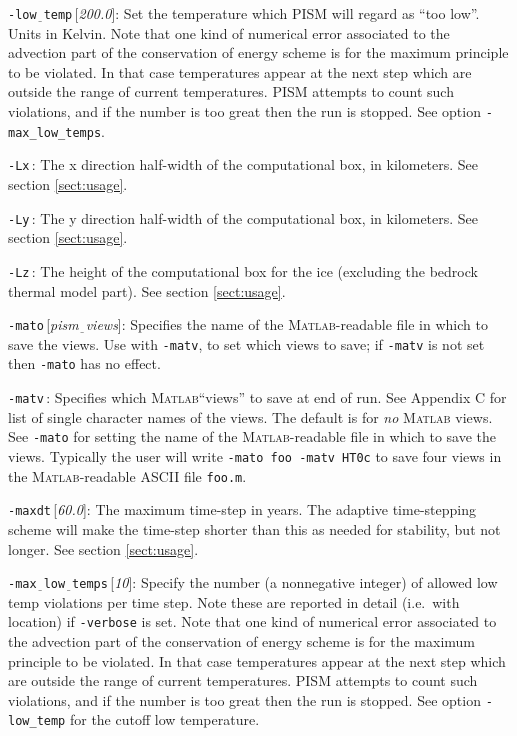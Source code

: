\documentclass[11pt,final]{amsart}
\newcommand{\Matlab}{\textsc{Matlab}\xspace}
\newcommand{\rawopt}[1]{\vspace{1mm}\noindent \large\texttt{-#1}\normalsize}
\newcommand{\opt}[1]{\rawopt{#1}\,:\quad}
\newcommand{\optdef}[2]{\rawopt{#1}\,[\textsl{#2}]:\quad}
\newcommand{\und}{$\underline{\,\,\,}$}
\begin{document}
\optdef{low\und temp}{200.0}  Set the temperature which PISM will regard as ``too low''.  Units in Kelvin.  Note that one kind of numerical error associated to the advection part of the conservation of energy scheme is for the maximum principle to be violated.  In that case temperatures appear at the next step which are outside the range of current temperatures.  PISM attempts to count such violations, and if the number is too great then the run is stopped.  See option \verb|-max_low_temps|.

\opt{Lx}  The x direction half-width of the computational box, in kilometers.  See section \ref{sect:usage}.

\opt{Ly}  The y direction half-width of the computational box, in kilometers.  See section \ref{sect:usage}.

\opt{Lz}  The height of the computational box for the ice (excluding the bedrock thermal model part).  See section \ref{sect:usage}.

\optdef{mato}{pism\und views}  Specifies the name of the \Matlab-readable file in which to save the views.  Use with \verb|-matv|, to set which views to save; if \verb|-matv| is not set then \verb|-mato| has no effect.

\opt{matv}  Specifies which \Matlab ``views'' to save at end of run.  See Appendix C for list of single character names of the views.  The default is for \emph{no} \Matlab views.  See \verb|-mato| for setting the name of the \Matlab-readable file in which to save the views.  Typically the user will write \verb|-mato foo -matv HT0c| to save four views in the \Matlab-readable ASCII file \verb|foo.m|.

\optdef{maxdt}{60.0}  The maximum time-step in years.  The adaptive time-stepping scheme will make the time-step shorter than this as needed for stability, but not longer.  See section \ref{sect:usage}.

\optdef{max\und low\und temps}{10}  Specify the number (a nonnegative integer) of allowed low temp violations per time step.  Note these are reported in detail (i.e.~with location) if \verb|-verbose| is set.  Note that one kind of numerical error associated to the advection part of the conservation of energy scheme is for the maximum principle to be violated.  In that case temperatures appear at the next step which are outside the range of current temperatures.  PISM attempts to count such violations, and if the number is too great then the run is stopped.  See option \verb|-low_temp| for the cutoff low temperature.
\end{document}
